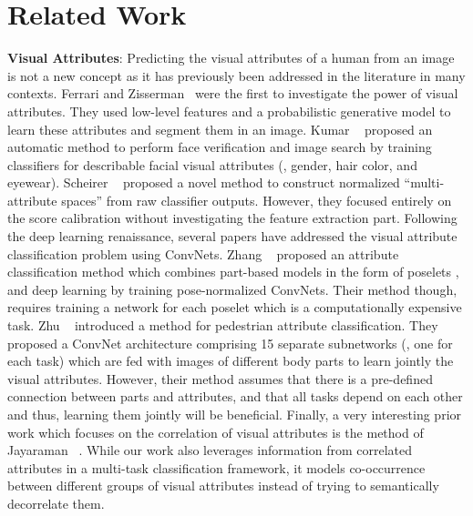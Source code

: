 \documentclass[10pt,twocolumn,letterpaper]{article}
\begin{document}
	\section{Related Work}
	\noindent\textbf{Visual Attributes}: Predicting the visual attributes of a human from an image is not a new concept as it has previously been addressed in the literature in many contexts. Ferrari and Zisserman~\cite{ferrari2007learning} were the first to investigate the power of visual attributes. They used low-level features and a probabilistic generative model to learn these attributes and segment them in an image. Kumar \etal~\cite{kumar} proposed an automatic method to perform face verification and image search by training classifiers for describable facial visual attributes (\eg, gender, hair color, and eyewear). Scheirer \etal~\cite{scheirer2012multi}  proposed a novel method to construct normalized ``multi-attribute spaces'' from raw classifier outputs. However, they focused entirely on the score calibration without investigating the feature extraction part. Following the deep learning renaissance, several papers \cite{gkioxari2015actions, rstarcnn, li2016human} have addressed the visual attribute classification
	problem using ConvNets. Zhang \etal~\cite{zhang2014panda} proposed an attribute classification method which combines part-based models in the form of poselets \cite{bourdev2011describing}, and deep learning by training pose-normalized ConvNets. Their method though, requires training a network for each poselet which is a computationally expensive task. Zhu \etal~\cite{zhu2015multi} introduced a method for pedestrian attribute classification. They proposed a ConvNet architecture comprising 15 separate subnetworks (\ie, one for each task) which are fed with images of different body parts to learn jointly the visual attributes. However, their method assumes that there is a pre-defined connection between parts and attributes, and that all tasks depend on each other and thus, learning them jointly will be beneficial. Finally, a very interesting prior work which focuses on the correlation of visual attributes is the method of Jayaraman \etal~\cite{jayaraman2014decorrelating}. While our work also leverages information from correlated attributes in a multi-task classification framework, it models co-occurrence between different groups of visual attributes instead of trying to semantically decorrelate them.
	
\end{document}
